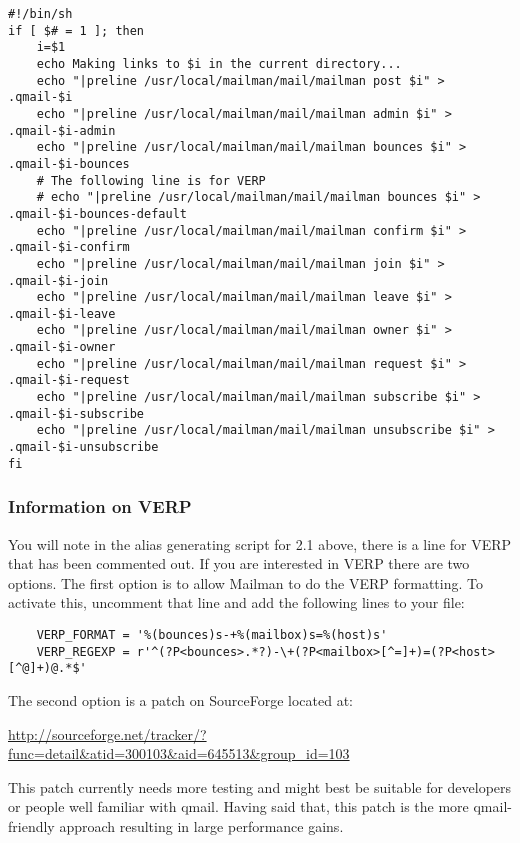 \documentclass{howto}
\begin{document}
\begin{verbatim}
#!/bin/sh
if [ $# = 1 ]; then
    i=$1
    echo Making links to $i in the current directory...
    echo "|preline /usr/local/mailman/mail/mailman post $i" > .qmail-$i
    echo "|preline /usr/local/mailman/mail/mailman admin $i" > .qmail-$i-admin
    echo "|preline /usr/local/mailman/mail/mailman bounces $i" > .qmail-$i-bounces
    # The following line is for VERP
    # echo "|preline /usr/local/mailman/mail/mailman bounces $i" > .qmail-$i-bounces-default
    echo "|preline /usr/local/mailman/mail/mailman confirm $i" > .qmail-$i-confirm
    echo "|preline /usr/local/mailman/mail/mailman join $i" > .qmail-$i-join
    echo "|preline /usr/local/mailman/mail/mailman leave $i" > .qmail-$i-leave
    echo "|preline /usr/local/mailman/mail/mailman owner $i" > .qmail-$i-owner
    echo "|preline /usr/local/mailman/mail/mailman request $i" > .qmail-$i-request
    echo "|preline /usr/local/mailman/mail/mailman subscribe $i" > .qmail-$i-subscribe
    echo "|preline /usr/local/mailman/mail/mailman unsubscribe $i" > .qmail-$i-unsubscribe
fi
\end{verbatim}

\subsubsection{Information on VERP}

You will note in the alias generating script for 2.1 above, there is a line
for VERP that has been commented out.  If you are interested in VERP there are
two options.  The first option is to allow Mailman to do the VERP formatting.
To activate this, uncomment that line and add the following lines to your
 file:

\begin{verbatim}
    VERP_FORMAT = '%(bounces)s-+%(mailbox)s=%(host)s'
    VERP_REGEXP = r'^(?P<bounces>.*?)-\+(?P<mailbox>[^=]+)=(?P<host>[^@]+)@.*$'
\end{verbatim}

The second option is a patch on SourceForge located at:

\url{http://sourceforge.net/tracker/?func=detail\&atid=300103\&aid=645513\&group_id=103}

This patch currently needs more testing and might best be suitable for
developers or people well familiar with qmail.  Having said that, this patch
is the more qmail-friendly approach resulting in large performance gains.
\end{document}

